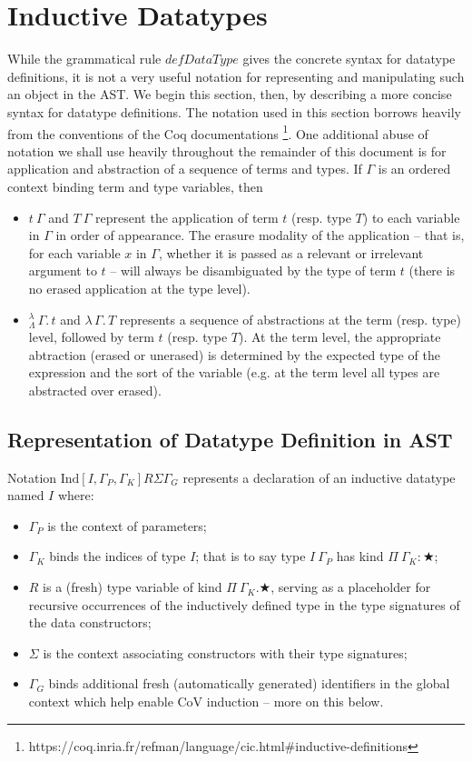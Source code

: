 \documentclass{article}
\newcommand{\absu}[3]{{#1}\, #2.\, #3}
\newcommand{\indsche}[3]{\ensuremath{\text{Ind}[#1,#2,#3]}}
\newcommand{\lamLam}{^{\lambda}_{\Lambda}}
\begin{document}
\newpage
\section{Inductive Datatypes}
\label{sec:ind-data}

While the grammatical rule $defDataType$ gives the concrete syntax for datatype
definitions, it is not a very useful notation for representing and manipulating
such an object in the AST. We begin this section, then, by describing a more
concise syntax for datatype definitions. The notation used in this section
borrows heavily from the conventions of the Coq documentations
\footnote{https://coq.inria.fr/refman/language/cic.html\#inductive-definitions}.
One additional abuse of notation we shall use heavily throughout the remainder
of this document is for application and abstraction of a sequence of terms and
types. If $\Gamma$ is an ordered context binding term and type variables, then

\begin{itemize}
\item $t\ \Gamma$ and $T\ \Gamma$ represent the application of term $t$ (resp.
  type $T$) to each variable in $\Gamma$ in order of appearance. The erasure
  modality of the application -- that is, for each variable $x$ in $\Gamma$,
  whether it is passed as a relevant or irrelevant argument to $t$ -- will
  always be disambiguated by the type of term $t$ (there is no erased
  application at the type level).
\item $\absu{\lamLam}{\Gamma}{t}$ and $\absu{\lambda}{\Gamma}{T}$ represents a
  sequence of abstractions at the term (resp. type) level, followed by term $t$
  (resp. type $T$). At the term level, the appropriate abtraction (erased or
  unerased) is determined by the expected type of the expression and the sort
  of the variable (e.g. at the term level all types are abstracted over erased).
\end{itemize}

\subsection{Representation of Datatype Definition in AST}

Notation $\indsche{I}{\Gamma_P}{\Gamma_K}{R}{\Sigma}{\Gamma_G}$ represents a declaration of
an inductive datatype named $I$ where:
\begin{itemize}
\item $\Gamma_P$ is the context of parameters;
\item $\Gamma_K$ binds the indices of type $I$; that is to say type $I\ \Gamma_P$ has kind
  $Π\ \Gamma_K: ★$;
\item $R$ is a (fresh) type variable of kind $Π\ \Gamma_K. ★$, serving as a placeholder for
  recursive occurrences of the inductively defined type in the type signatures
  of the data constructors;
\item $\Sigma$ is the context associating constructors with their type
  signatures;
\item $\Gamma_G$ binds additional fresh (automatically generated) identifiers in
  the global context which help enable CoV induction -- more on this below.
\end{itemize}
\end{document}
